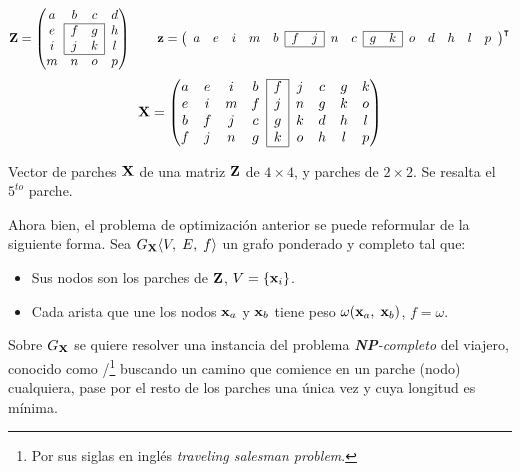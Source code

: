 \begin{example}[H]
	\[\Z = \left(
		\begin{matrix}
			a & b & c & d\\\cline{2-3}
			e & \multicolumn{1}{|c}{f} & \multicolumn{1}{c|}{g} & h\\
			i & \multicolumn{1}{|c}{j} & \multicolumn{1}{c|}{k} & l\\\cline{2-3}
			m & n & o & p\\
		\end{matrix}
	\right)
	\qquad\z = \left(
		\begin{array}{ccccc|cc|cc|cc|ccccc}
			\cline{6-7}\cline{10-11}
			a & e & i & m & b & f & j & n & c & g & k & o & d & h & l & p \\
			\cline{6-7}\cline{10-11}
		\end{array}
	\right)^\intercal\]
	\[\X = \left(
		\begin{matrix}\cline{5-5}
			a & e & i & b & \multicolumn{1}{|c|}{f} & j & c & g & k\\
			e & i & m & f & \multicolumn{1}{|c|}{j} & n & g & k & o\\
			b & f & j & c & \multicolumn{1}{|c|}{g} & k & d & h & l\\
			f & j & n & g & \multicolumn{1}{|c|}{k} & o & h & l & p\\\cline{5-5}
		\end{matrix}
	\right)\]
	\caption{Vector de parches $\mathbf{X}$ de una matriz $\mathbf{Z}$ de $4 \times 4$, y parches de $2 \times 2$. Se resalta el $5^{to}$ parche.}
	\label{ex:vector_X}
\end{example}

Ahora bien, el problema de optimizaci\'on anterior se puede reformular de la siguiente forma. Sea $G_{\mathbf{X}} \langle V,\;E,\;f\rangle$ un grafo ponderado y completo \cite{west2001introduction} tal que:
\begin{itemize}
	\item Sus nodos son los parches de $\mathbf{Z}$, $V = \{\mathbf{x}_i\}$.
	\item Cada arista que une los nodos $\mathbf{x}_a$ y $\mathbf{x}_b$ tiene peso $\omega(\mathbf{x}_a,\; \mathbf{x}_b)$, $f = \omega$.
\end{itemize}
Sobre $G_{\mathbf{X}}$ se quiere resolver una instancia del problema \textit{\textbf{NP}-completo} del viajero, conocido como \TSP/\footnote{Por sus siglas en ingl\'es \textit{traveling salesman problem}.} \cite{cormen2009introduction,enwiki:tsp} buscando un camino que comience en un parche (nodo) cualquiera, pase por el resto de los parches una \'unica vez y cuya longitud es m\'inima.

